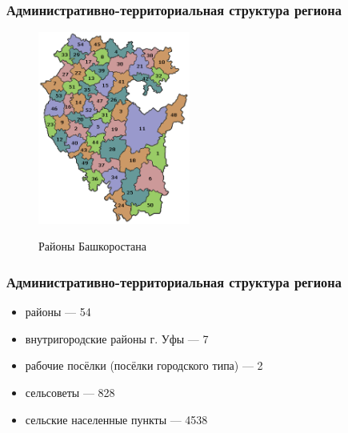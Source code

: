 \begin{frame}
\frametitle{Административно-территориальная структура
	региона}

\begin{figure}[h!]
	\begin{center}
		{\includegraphics[width=50mm]{pics/alina/admin.png}}
		\caption{Районы Башкоростана}
	\end{center}
\end{figure}

\end{frame}

\begin{frame}
\frametitle{Административно-территориальная структура
	региона}

\begin{itemize}
	\item районы — 54
	\item внутригородские районы г. Уфы — 7
	\item рабочие посёлки (посёлки городского типа) — 2
	\item сельсоветы — 828
	\item сельские населенные пункты — 4538
\end{itemize}

\end{frame}

